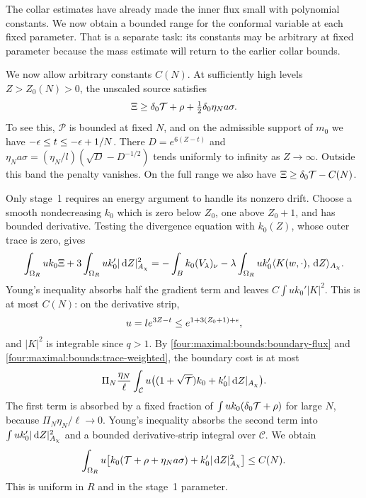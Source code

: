 The collar estimates have already made the inner flux small with
polynomial constants.  We now obtain a bounded range for the conformal
variable at each fixed parameter.  That is a separate task: its constants
may be arbitrary at fixed parameter because the mass estimate will
return to the earlier collar bounds.

We now allow arbitrary constants $C(N)$. At sufficiently high levels
$Z>Z_0(N)>0$, the unscaled source satisfies
\begin{equation}\label{four:maximal:bounds:high-source}
 \Xi\ge\delta_0\mathcal T+\rho+\tfrac12\delta_0\eta_N a\sigma.
\end{equation}
To see this, $\mathcal P$ is bounded at fixed $N$, and on the admissible
support of $m_0$ we have
$-\epsilon\le t\le-\epsilon+1/N$. There
$D=e^{6(Z-t)}$ and
$\eta_N a\sigma=(\eta_N/l)(\sqrt D-D^{-1/2})$ tends uniformly to infinity
as $Z\to\infty$. Outside this band the penalty vanishes.
On the full range we also have $\Xi\ge\delta_0\mathcal T-C(N)$.

Only stage~1 requires an energy argument to handle its nonzero drift.
Choose a smooth nondecreasing $k_0$ which is zero below $Z_0$, one
above $Z_0+1$, and has bounded derivative. Testing the divergence
equation with $k_0(Z)$, whose outer trace is zero, gives
\[
 \int_{\Omega_R}uk_0\Xi
       +3\int_{\Omega_R}uk_0'|\,\mathrm d Z|_{A_\chi}^2
 =-\int_B k_0(V_\lambda)_\nu
       -\lambda\int_{\Omega_R}uk_0'
                   \langle K(w,\cdot),\,\mathrm d Z\rangle_{A_\chi}.
\]
Young's inequality absorbs half the gradient term and leaves
$C\int uk_0'|K|^2$. This is at most $C(N)$: on the derivative strip,
\[
 u=l e^{3Z-t}\le e^{1+3(Z_0+1)+\epsilon},
\]
and $|K|^2$ is integrable since $q>1$.
By \eqref{four:maximal:bounds:boundary-flux} and \eqref{four:maximal:bounds:trace-weighted},
the boundary cost is at most
\[
 \Pi_N\frac{\eta_N}{\ell}\int_{\mathcal C}
   u\bigl((1+\sqrt{\mathcal T})k_0+k_0'|\,\mathrm d Z|_{A_\chi}\bigr).
\]
The first term is absorbed by a fixed fraction of
$\int uk_0(\delta_0\mathcal T+\rho)$ for large $N$, because
$\Pi_N\eta_N/\ell\to0$. Young's inequality absorbs the second term
into $\int uk_0'|\,\mathrm d Z|_{A_\chi}^2$ and a bounded derivative-strip
integral over $\mathcal C$. We obtain
\begin{equation}\label{four:maximal:bounds:global-energy}
 \int_{\Omega_R}u\bigl[
       k_0(\mathcal T+\rho+\eta_N a\sigma)
                    +k_0'|\,\mathrm d Z|_{A_\chi}^2\bigr]\le C(N).
\end{equation}
This is uniform in $R$ and in the stage~1 parameter.

